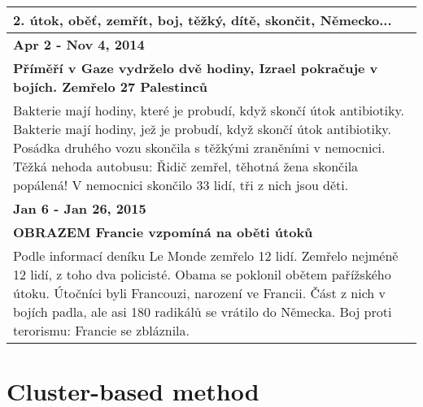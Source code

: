 \hspace{\fill}

\begin{tabularx}{\linewidth}{p{\linewidth}} \toprule[1.5pt]
\bf 2. útok, oběť, zemřít, boj, těžký, dítě, skončit, Německo... \\ \midrule
\bf Apr 2 - Nov 4, 2014 \\ \midrule
\bf Příměří v Gaze vydrželo dvě hodiny, Izrael pokračuje v bojích. Zemřelo 27 Palestinců \\
Bakterie mají hodiny, které je probudí, když skončí útok antibiotiky. Bakterie mají hodiny, jež je probudí, když skončí útok antibiotiky. Posádka druhého vozu skončila s těžkými zraněními v nemocnici. Těžká nehoda autobusu: Řidič zemřel, těhotná žena skončila popálená! V nemocnici skončilo 33 lidí, tři z nich jsou děti. \\ \bottomrule[1.25pt]

\bf Jan 6 - Jan 26, 2015 \\ \midrule
\bf OBRAZEM Francie vzpomíná na oběti útoků \\
Podle informací deníku Le Monde zemřelo 12 lidí. Zemřelo nejméně 12 lidí, z toho dva policisté. Obama se poklonil obětem pařížského útoku. Útočníci byli Francouzi, narození ve Francii. Část z nich v bojích padla, ale asi 180 radikálů se vrátilo do Německa. Boj proti terorismu: Francie se zbláznila. \\ \bottomrule[1.25pt]

\end{tabularx}
\hspace{\fill}


\section{Cluster-based method}
